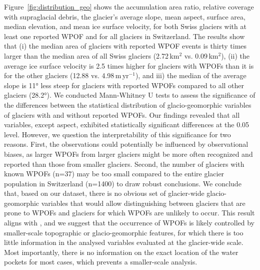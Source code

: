 Figure~\ref{fig:distribution_geo} shows the accumulation area ratio, relative coverage with supraglacial debris, the glacier's average slope, mean aspect, surface area, median elevation, and mean ice surface velocity, for both Swiss glaciers with at least one reported WPOF and for all glaciers in Switzerland. The results show that (i) the median area of glaciers with reported WPOF events is thirty times larger than the median area of all Swiss glaciers (2.72\,km$^2$ vs. 0.09\,km$^2$), (ii) the average ice surface velocity is 2.5 times higher for glaciers with WPOFs than it is for the other glaciers (12.88 vs. 4.98\,m\,yr$^{-1}$), and iii) the median of the average slope is 11° less steep for glaciers with reported WPOFs compared to all other glaciers (28.2°). We conducted Mann-Whitney U tests to assess the significance of the differences between the statistical distribution of glacio-geomorphic variables of glaciers with and without reported WPOFs. Our findings revealed that all variables, except aspect, exhibited statistically significant differences at the 0.05 level. However, we question the interpretability of this significance for two reasons. First, the observations could potentially be influenced by observational biases, as larger WPOFs from larger glaciers might be more often recognized and reported than those from smaller glaciers. Second, the number of glaciers with known WPOFs (n=37) may be too small compared to the entire glacier population in Switzerland (n=1400) to draw robust conclusions. We conclude that, based on our dataset, there is no obvious set of glacier-wide glacio-geomorphic variables that would allow distinguishing between glaciers that are prone to WPOFs and glaciers for which WPOFs are unlikely to occur. This result aligns with \citet{Haeberli1983}, and we suggest that the occurrence of WPOFs is likely controlled by smaller-scale topographic or glacio-geomorphic features, for which there is too little information in the analysed variables evaluated at the glacier-wide scale. Most importantly, there is no information on the exact location of the water pockets for most cases, which prevents a smaller-scale analysis.  


